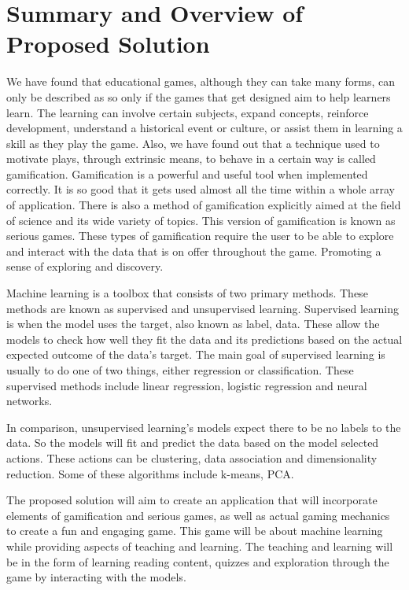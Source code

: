 	\section{Summary and Overview of Proposed Solution}
		We have found that educational games, although they can take many forms, can only be described as so only if the games that get designed aim to help learners learn. The learning can involve certain subjects, expand concepts, reinforce development, understand a historical event or culture, or assist them in learning a skill as they play the game. Also, we have found out that a technique used to motivate plays, through extrinsic means, to behave in a certain way is called gamification. Gamification is a powerful and useful tool when implemented correctly. It is so good that it gets used almost all the time within a whole array of application. There is also a method of gamification explicitly aimed at the field of science and its wide variety of topics. This version of gamification is known as serious games. These types of gamification require the user to be able to explore and interact with the data that is on offer throughout the game. Promoting a sense of exploring and discovery.
		
		Machine learning is a toolbox that consists of two primary methods. These methods are known as supervised and unsupervised learning. Supervised learning is when the model uses the target, also known as label, data. These allow the models to check how well they fit the data and its predictions based on the actual expected outcome of the data's target. The main goal of supervised learning is usually to do one of two things, either regression or classification. These supervised methods include linear regression, logistic regression and neural networks.
		
		In comparison, unsupervised learning's models expect there to be no labels to the data. So the models will fit and predict the data based on the model selected actions. These actions can be clustering, data association and dimensionality reduction. Some of these algorithms include k-means, PCA.
		
		The proposed solution will aim to create an application that will incorporate elements of gamification and serious games, as well as actual gaming mechanics to create a fun and engaging game. This game will be about machine learning while providing aspects of teaching and learning. The teaching and learning will be in the form of learning reading content, quizzes and exploration through the game by interacting with the models.